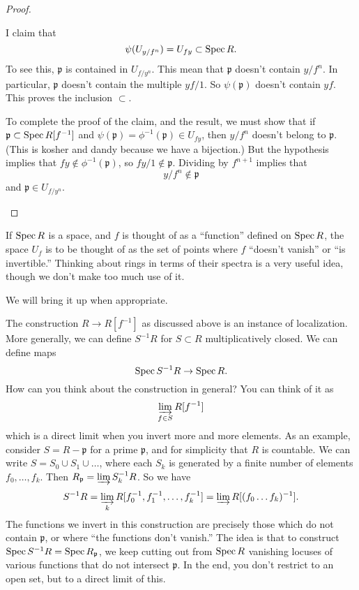 \begin{proof}
\begin{enumerate}
I claim that
\[ \psi(U_{y/f^n}) = U_{fy} \subset \operatorname{Spec} R.  \]
To see this, $\mathfrak{p}$ is contained in $U_{f/y^n}$. This
mean that
$\mathfrak{p}$ doesn't contain $y/f^n$. In particular,
$\mathfrak{p}$ doesn't
contain the multiple $yf/1$. So $\psi(\mathfrak{p})$ doesn't
contain $yf$.
This proves the inclusion $\subset$.  

To complete the proof of the claim, and
the result, we must show that if $\mathfrak{p} \subset \operatorname{Spec}
R[f^{-1}]$ and
$\psi(\mathfrak{p}) = \phi^{-1}(\mathfrak{p}) \in U_{fy}$, then
$y/f^n$ doesn't
belong to $\mathfrak{p}$. (This is kosher and dandy because we
have a bijection.) But the hypothesis implies that $fy \notin
\phi^{-1}(\mathfrak{p})$, so $fy/1 \notin \mathfrak{p}$.
Dividing by $f^{n+1}$
implies that
\[ y/f^{n} \notin \mathfrak{p}  \]
and $\mathfrak{p} \in U_{f/y^n}$. \qedhere
\end{enumerate}
\end{proof} 

If $\operatorname{Spec} R$ is a space, and $f$ is thought of as a ``function''
defined on
$\operatorname{Spec} R$, the space $U_f$ is to be thought of as the set of
points where $f$
``doesn't vanish'' or ``is invertible.''
Thinking about rings in terms of their spectra is a very useful
idea, though we
don't make too much use of it. 

We will bring it up when appropriate.  

\begin{remark} 
The construction $R \to R[f^{-1}]$ as discussed above is an
instance of
localization. More generally, we can define $S^{-1}R$ for $S
\subset R$
multiplicatively closed. We can define maps
\[ \operatorname{Spec} S^{-1}R \to \operatorname{Spec} R . \]
How can you think about the construction in general? You can
think of it as
\[ \varinjlim_{f \in S} R[f^{-1}]  \]
which is a direct limit when you invert more and more elements.
As an example, consider $S = R - \mathfrak{p}$ for a prime
$\mathfrak{p}$, and for
simplicity that $R$ is countable. We can write $S =
S_0 \cup S_1 \cup \dots$, where each $S_k$ is generated by a
finite number of
elements $f_0, \dots, f_k$. Then $R_{\mathfrak{p}} = \varinjlim
S_k^{-1} R$.
So we have
\[ S^{-1}R = \varinjlim_k R[f_0^{-1} , f_1^{-1}, \dots, f_k^{-1}
] = \varinjlim
R[(f_0\dots f_k)^{-1}]. \]
The functions we invert in this construction are precisely those
which do not
contain $\mathfrak{p}$, or where ``the functions don't vanish.''
The idea is
that to construct $\operatorname{Spec} S^{-1}R = \operatorname{Spec} R_{\mathfrak{p}}$, we
keep cutting out
from $\operatorname{Spec} R$ vanishing locuses of various functions that do
not
intersect $\mathfrak{p}$. In the end, you don't restrict to an
open set, but
to a direct limit of this.
\end{remark} 


